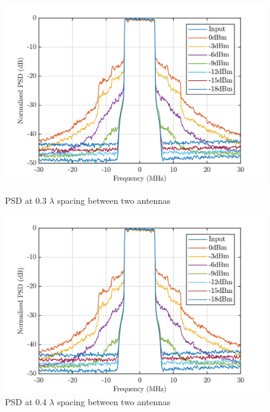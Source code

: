 \begin{figure}[H]
  \centering
  \begin{minipage}[b]{0.5\textwidth}
	\includegraphics[scale = 0.5]{figures/measurement/two_antenna/psd_03.png}
	\caption{PSD at 0.3 $\lambda$ spacing between two antennas}
    \label{fig:psd03}
  \end{minipage}
  \hfill
  \begin{minipage}[b]{0.4\textwidth}
\includegraphics[scale = 0.5]{figures/measurement/two_antenna/psd_04.png}
\caption{PSD at 0.4 $\lambda$ spacing between two antennas}
    \label{fig:psd04}
  \end{minipage}
\end{figure}

